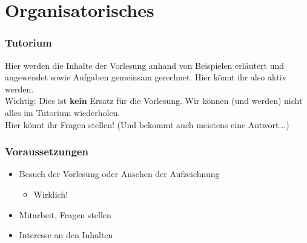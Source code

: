 
\newcommand{\mydate}{28.10.2016}

\newcommand{\handout}{}



\graphicspath{{../figures/}}



\section{Organisatorisches}

\aboutMeFrame

\begin{frame}
	\frametitle{Tutorium}
	Hier werden die Inhalte der Vorlesung anhand von Beispielen erläutert und angewendet sowie Aufgaben gemeinsam gerechnet. Hier könnt ihr also aktiv werden. \\ Wichtig: Dies ist \textbf{kein} Ersatz für die Vorlesung. Wir können (und werden) nicht alles im Tutorium wiederholen. \\[2em]
	\pause
	Hier könnt ihr Fragen stellen! (Und bekommt auch meistens eine Antwort...)
\end{frame}

\begin{frame}
	\frametitle{Voraussetzungen}
	\begin{itemize}
		\item Besuch der Vorlesung oder Ansehen der Aufzeichnung
		\begin{itemize} \item Wirklich! \end{itemize}
		\item Mitarbeit, Fragen stellen
		\item Interesse an den Inhalten
	\end{itemize}
\end{frame}

